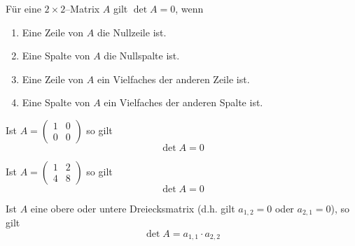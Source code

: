 \medbreak

\begin{regel}\label{det_rule_2_2} Für eine $2 \times 2$--Matrix $A$ gilt $\det{A} = 0$, wenn 

\begin{enumerate}
\item Eine Zeile von $A$ die Nullzeile ist.
\item Eine Spalte von $A$ die Nullspalte ist.
\item Eine Zeile von $A$ ein Vielfaches der anderen Zeile ist.
\item Eine Spalte von $A$ ein Vielfaches der anderen Spalte ist. 
\end{enumerate}
\end{regel}

\begin{beispiel} Ist $A = \left( \begin{smallmatrix} 1 & 0 \\ 0 & 0 \end{smallmatrix} \right)$ so gilt
  	$$ \det{A} = 0 $$
\end{beispiel}

\begin{beispiel} Ist $A = \left( \begin{smallmatrix} 1 & 2 \\ 4 & 8 \end{smallmatrix} \right)$ so gilt
  	$$ \det{A} = 0 $$
\end{beispiel}


\medbreak

\begin{regel}\label{det_rul_2_trig} Ist $A$ eine obere oder untere Dreiecksmatrix (d.h. gilt $a_{1,2} = 0$ 
oder $a_{2,1} = 0$), so gilt
  	$$ \det{A} = a_{1,1} \cdot a_{2,2} $$
\end{regel}


